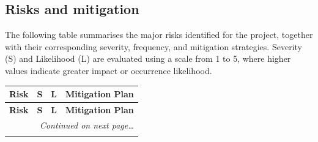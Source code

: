 \subsection{Risks and mitigation}
The following table summarises the major risks identified for the project, together with their corresponding severity, frequency, and mitigation strategies. Severity (S) and Likelihood (L) are evaluated using a scale from 1 to 5, where higher values indicate greater impact or occurrence likelihood.

\begin{longtable}{|p{3.5cm}|p{0.5cm}|p{0.5cm}|p{10cm}|}
    \hline
    \textbf{Risk} & \textbf{S} & \textbf{L} & \textbf{Mitigation Plan} \\
    \hline
    \endfirsthead

    \hline
    \textbf{Risk} & \textbf{S} & \textbf{L} & \textbf{Mitigation Plan} \\
    \hline
    \endhead

    \hline
    \multicolumn{4}{|r|}{\textit{Continued on next page\ldots}} \\
    \hline
    \endfoot

    \endlastfoot


\end{longtable}
